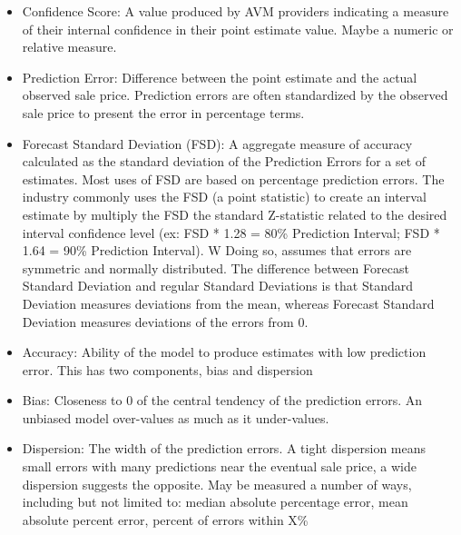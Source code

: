 \documentclass[colTwo]{anon}
\theoremstyle{definition}
\begin{document}
\begin{itemize}
\item Confidence Score: A value produced by AVM providers indicating a measure of their internal confidence in their point estimate value.  Maybe a numeric or relative measure. 
\item Prediction Error: Difference between the point estimate and the actual observed sale price. Prediction errors are often standardized by the observed sale price to present the error in percentage terms.
\item Forecast Standard Deviation (FSD):  A aggregate measure of accuracy calculated as the standard deviation of the Prediction Errors for a set of estimates. Most uses of FSD are based on percentage prediction errors. The industry commonly uses the FSD (a point statistic) to create an interval estimate by multiply the FSD the standard Z-statistic related to the desired interval confidence level (ex: FSD * 1.28 = 80\% Prediction Interval; FSD * 1.64 = 90\% Prediction Interval). W Doing so, assumes that errors are symmetric and normally distributed. The difference between Forecast Standard Deviation and regular Standard Deviations is that Standard Deviation measures deviations from the mean, whereas Forecast Standard Deviation measures deviations of the errors from 0.
\item Accuracy: Ability of the model to produce estimates with low prediction error.  This has two components, bias and dispersion
\item Bias: Closeness to 0 of the central tendency of the prediction errors.  An unbiased model over-values as much as it under-values.  
\item Dispersion: The width of the prediction errors.  A tight dispersion means small errors with many predictions near the eventual sale price, a wide dispersion suggests the opposite.  May be measured a number of ways, including but not limited to: median absolute percentage error, mean absolute percent error, percent of errors within X\%
\end{itemize}
\end{document}
